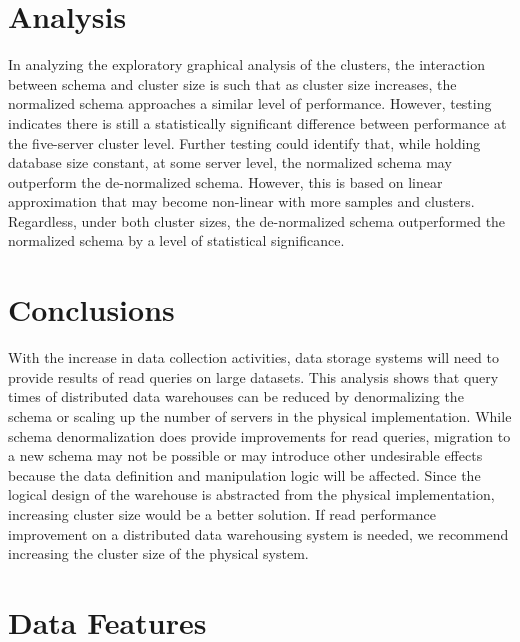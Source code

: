 \documentclass[journal]{IEEEtran}
\begin{document}
\section{Analysis}

In analyzing the exploratory graphical analysis of the clusters, 
 the interaction between schema and cluster size is such that as cluster size increases,
 the normalized schema approaches a similar level of performance. 
However, testing indicates there is still a statistically significant difference between 
 performance at the five-server cluster level. 
Further testing could identify that, while holding database size constant, at some server level, 
 the normalized schema may outperform the de-normalized schema. 
However, this is based on linear approximation that may become non-linear with more samples and clusters. 
Regardless, under both cluster sizes,
 the de-normalized schema outperformed the normalized schema by a level of statistical significance.

\section{Conclusions}

With the increase in data collection activities,
 data storage systems will need to provide results of read queries on large datasets.
This analysis shows that query times of distributed data warehouses can be reduced by denormalizing the schema or 
 scaling up the number of servers in the physical implementation.
While schema denormalization does provide improvements for read queries,
 migration to a new schema may not be possible
 or may introduce other undesirable effects because the data definition and manipulation logic will be affected.
Since the logical design of the warehouse is abstracted from the physical implementation,
 increasing cluster size would be a better solution.
If read performance improvement on a distributed data warehousing system is needed,
 we recommend increasing the cluster size of the physical system. 

\ifCLASSOPTIONcaptionsoff
  \newpage
\fi

\appendices

\section{Data Features}
\label{DataFeatures}
\end{document}
